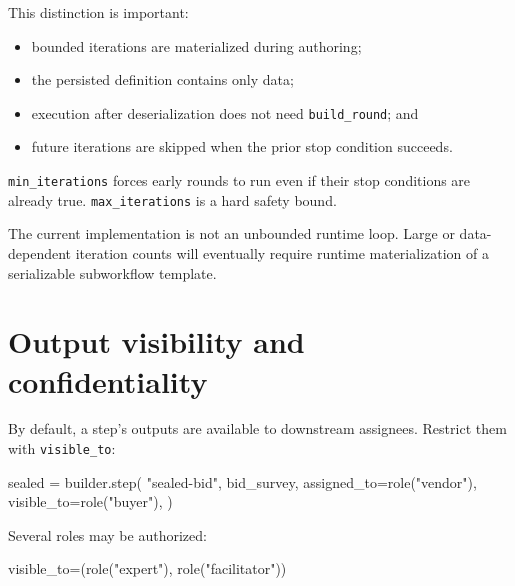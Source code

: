 \documentclass[
  10pt,
]{report}
\newenvironment{Shaded}{}{}
\newcommand{\NormalTok}[1]{#1}
\newcommand{\OperatorTok}[1]{\textcolor[rgb]{0.40,0.40,0.40}{#1}}
\newcommand{\StringTok}[1]{\textcolor[rgb]{0.25,0.44,0.63}{#1}}
\providecommand{\tightlist}{%
  \setlength{\itemsep}{0pt}\setlength{\parskip}{0pt}}
\begin{document}
This distinction is important:

\begin{itemize}
\tightlist
\item
  bounded iterations are materialized during authoring;
\item
  the persisted definition contains only data;
\item
  execution after deserialization does not need \texttt{build\_round};
  and
\item
  future iterations are skipped when the prior stop condition succeeds.
\end{itemize}

\texttt{min\_iterations} forces early rounds to run even if their stop
conditions are already true. \texttt{max\_iterations} is a hard safety
bound.

The current implementation is not an unbounded runtime loop. Large or
data-dependent iteration counts will eventually require runtime
materialization of a serializable subworkflow template.

\chapter{Output visibility and
confidentiality}\label{output-visibility-and-confidentiality}

By default, a step's outputs are available to downstream assignees.
Restrict them with \texttt{visible\_to}:

\begin{Shaded}
\begin{Highlighting}[]
\NormalTok{sealed }\OperatorTok{=}\NormalTok{ builder.step(}
    \StringTok{"sealed{-}bid"}\NormalTok{,}
\NormalTok{    bid\_survey,}
\NormalTok{    assigned\_to}\OperatorTok{=}\NormalTok{role(}\StringTok{"vendor"}\NormalTok{),}
\NormalTok{    visible\_to}\OperatorTok{=}\NormalTok{role(}\StringTok{"buyer"}\NormalTok{),}
\NormalTok{)}
\end{Highlighting}
\end{Shaded}

Several roles may be authorized:

\begin{Shaded}
\begin{Highlighting}[]
\NormalTok{visible\_to}\OperatorTok{=}\NormalTok{(role(}\StringTok{"expert"}\NormalTok{), role(}\StringTok{"facilitator"}\NormalTok{))}
\end{Highlighting}
\end{Shaded}
\end{document}
